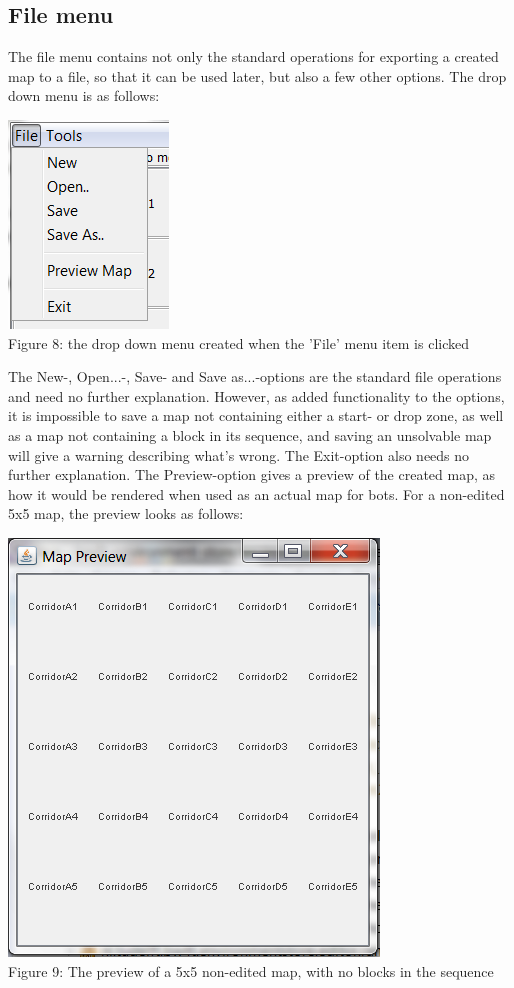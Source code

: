 \subsection{File menu}
The file menu contains not only the standard operations for exporting a created map to a file, so that it can be used later, but also a few other options. The drop down menu is as follows:
\begin{center}
	\centering
	\includegraphics{DropDownFile.png}\\
	Figure 8: the drop down menu created when the 'File' menu item is clicked
\end{center}
The New-, Open...-, Save- and Save as...-options are the standard file operations and need no further explanation. However, as added functionality to the options, it is impossible to save a map not containing either a start- or drop zone, as well as a map not containing a block in its sequence, and saving an unsolvable map will give a warning describing what's wrong. The Exit-option also needs no further explanation. The Preview-option gives a preview of the created map, as how it would be rendered when used as an actual map for bots. For a non-edited 5x5 map, the preview looks as follows:
\begin{center}
	\centering
	\includegraphics{Preview.png}\\
	Figure 9: The preview of a 5x5 non-edited map, with no blocks in the sequence
\end{center}
